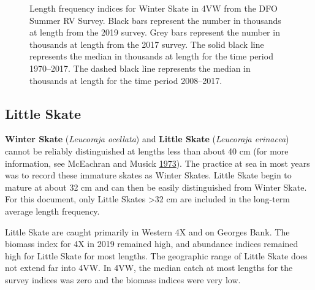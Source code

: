 \documentclass[11pt]{book}
\begin{document}
\begin{figure}[htb]

{\centering {} 

}

\caption{Length frequency indices for Winter Skate in 4VW from the DFO Summer RV Survey. Black bars represent the number in thousands at length from the 2019 survey. Grey bars represent the number in thousands at length from the 2017 survey. The solid black line represents the median in thousands at length for the time period 1970--2017. The dashed black line represents the median in thousands at length for the time period 2008--2017.}\label{fig:94-fig-winterskate-lengthfreq4VW}
\end{figure}
\clearpage

\hypertarget{little-skate}{%
\subsection{Little Skate}\label{little-skate}}

\textbf{Winter Skate} (\emph{Leucoraja ocellata}) and \textbf{Little Skate} (\emph{Leucoraja erinacea}) cannot be reliably distinguished at lengths less than about 40 cm (for more information, see McEachran and Musick \protect\hyperlink{ref-McEachran1973}{1973}). The practice at sea in most years was to record these immature skates as Winter Skates. Little Skate begin to mature at about 32 cm and can then be easily distinguished from Winter Skate. For this document, only Little Skates \textgreater32 cm are included in the long-term average length frequency.

Little Skate are caught primarily in Western 4X and on Georges Bank. The biomass index for 4X in 2019 remained high, and abundance indices remained high for Little Skate for most lengths. The geographic range of Little Skate does not extend far into 4VW. In 4VW, the median catch at most lengths for the survey indices was zero and the biomass indices were very low.
\end{document}
